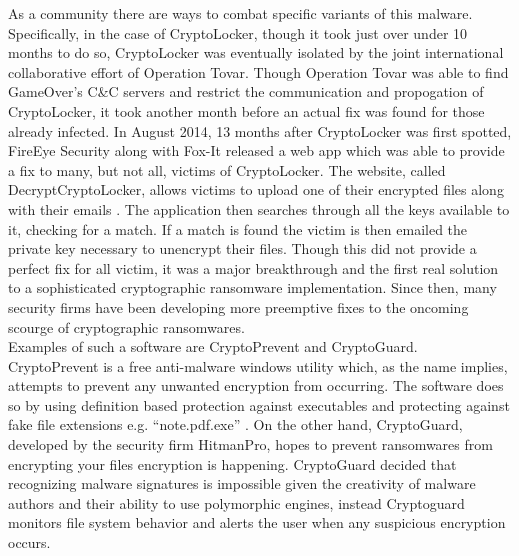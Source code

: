 \documentclass[11.5pt]{article}
\begin{document}
As a community there are ways to combat specific variants of this malware.  Specifically, in the case of CryptoLocker, though it took just over under 10 months to do so, CryptoLocker was eventually isolated by the joint international collaborative effort of Operation Tovar.  Though Operation Tovar was able to find GameOver's C\&C servers and restrict the communication and propogation of CryptoLocker, it took another month before an actual fix was found for those already infected.   In August 2014, 13 months after CryptoLocker was first spotted, FireEye Security along with Fox-It released a web app which was able to provide a fix to many, but not all, victims of CryptoLocker.  The website, called DecryptCryptoLocker, allows victims to upload one of their encrypted files along with their emails \cite{fireeye}.  The application then searches through all the keys available to it, checking for a match.  If a match is found the victim is then emailed the private key necessary to unencrypt their files.  Though this did not provide a perfect fix for all victim, it was a major breakthrough and the first real solution to a sophisticated cryptographic ransomware implementation.  Since then, many security firms have been developing more preemptive fixes to the oncoming scourge of cryptographic ransomwares.\\

Examples of such a software are CryptoPrevent and CryptoGuard.  CryptoPrevent is a free anti-malware windows utility which, as the name implies, attempts to prevent any unwanted encryption from occurring.  The software does so by using definition based protection against executables and protecting against fake file extensions e.g. “note.pdf.exe” \cite{prevent}. On the other hand, CryptoGuard, developed by the security firm HitmanPro, hopes to prevent ransomwares from encrypting your files encryption is happening. \cite{hitman}  CryptoGuard decided that recognizing malware signatures is impossible given the creativity of malware authors and their ability to use polymorphic engines, instead Cryptoguard monitors file system behavior and alerts the user when any suspicious encryption occurs.  
\end{document}
